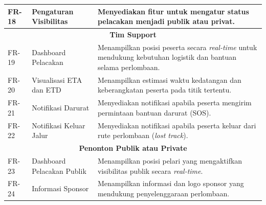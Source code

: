 \begin{longtable}{|p{1.8cm}|p{4cm}|p{7cm}|}
FR-18 & Pengaturan Visibilitas &
Menyediakan fitur untuk mengatur status pelacakan menjadi publik atau privat. \\ \hline


\multicolumn{3}{|c|}{\textbf{Tim Support}} \\ \hline

FR-19 & Dashboard Pelacakan &
Menampilkan posisi peserta secara \textit{real-time} untuk mendukung kebutuhan logistik dan bantuan selama perlombaan. \\ \hline

FR-20 & Visualisasi ETA dan ETD &
Menampilkan estimasi waktu kedatangan dan keberangkatan peserta pada titik tertentu. \\ \hline

FR-21 & Notifikasi Darurat &
Menyediakan notifikasi apabila peserta mengirim permintaan bantuan darurat (SOS). \\ \hline

FR-22 & Notifikasi Keluar Jalur &
Menyediakan notifikasi apabila peserta keluar dari rute perlombaan (\textit{lost track}). \\ \hline


\multicolumn{3}{|c|}{\textbf{Penonton Publik atau Private}} \\ \hline

FR-23 & Dashboard Pelacakan Publik &
Menampilkan posisi pelari yang mengaktifkan visibilitas publik secara \textit{real-time}. \\ \hline

FR-24 & Informasi Sponsor &
Menampilkan informasi dan logo sponsor yang mendukung penyelenggaraan perlombaan. \\ \hline

\end{longtable}